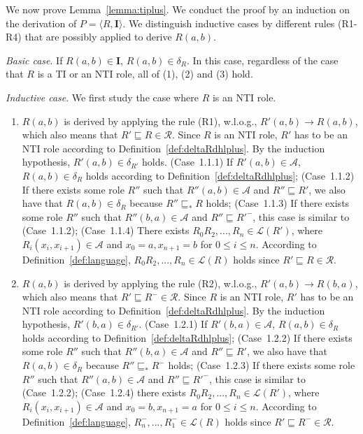 We now prove Lemma~\ref{lemma:tiplus}.
We conduct the proof by an induction on
the derivation of $P=\langle R,\textbf{I}\rangle$. We distinguish inductive cases by different rules (R1-R4)
that are possibly applied to derive $R(a,b)$.

\emph{Basic case}. If $R(a,b)\in\textbf{I}$, $R(a,b)\in\delta_{R}$. In this case,
regardless of the case that $R$ is a TI or an NTI role, all of (1), (2) and (3) hold.

\emph{Inductive case}. We first study the case where $R$ is an NTI role.

\begin{enumerate}[leftmargin=12ex,label=Case~1.\arabic*, ref=Case~1.\arabic*]
\item $R(a,b)$ is derived by applying the rule (R1), w.l.o.g., $R'(a,b)\rightarrow R(a,b)$,
    which also means that $R'\sqsubseteq R\in\mathcal{R}$. Since $R$ is an NTI role, $R'$ has to
    be an NTI role according to Definition~\ref{def:deltaRdhlplus}. By the induction hypothesis,
    $R'(a,b)\in\delta_{R'}$ holds. (Case~1.1.1) If $R'(a,b)\in\mathcal{A}$, $R(a,b)\in\delta_{R}$
    holds according to Definition~\ref{def:deltaRdhlplus}; (Case~1.1.2) If there exists some
    role $R''$ such that $R''(a,b)\in\mathcal{A}$ and $R''\sqsubseteq R'$, we also have that
    $R(a,b)\in\delta_{R}$ because $R''\sqsubseteq_* R$ holds; (Case~1.1.3) If there exists some
    role $R''$ such that $R''(b,a)\in\mathcal{A}$ and $R''\sqsubseteq R'^-$, this case is
    similar to (Case~1.1.2); (Case~1.1.4) There exists $R_0R_2,...,R_n\in\mathcal{L}(R')$,
    where $R_i(x_i,x_{i+1})\in\mathcal{A}$ and $x_0=a, x_{n+1}=b$ for $0\leq i\leq n$.
    According to Definition~\ref{def:language}, $R_0R_2,...,R_n\in\mathcal{L}(R)$ holds since
    $R'\sqsubseteq R\in\mathcal{R}$.\label{dhlplus:NTIcaseR1}

\item $R(a,b)$ is derived by applying the rule (R2), w.l.o.g., $R'(a,b)\rightarrow R(b,a)$,
    which also means that $R'\sqsubseteq R^-\in\mathcal{R}$. Since $R$ is an NTI role, $R'$ has to
    be an NTI role according to Definition~\ref{def:deltaRdhlplus}. By the induction hypothesis,
    $R'(b,a)\in\delta_{R'}$. (Case~1.2.1) If $R'(b,a)\in\mathcal{A}$, $R(a,b)\in\delta_{R}$
    holds according to Definition~\ref{def:deltaRdhlplus}; (Case~1.2.2) If there exists some
    role $R''$ such that $R''(b,a)\in\mathcal{A}$ and $R''\sqsubseteq R'$, we also have that
    $R(a,b)\in\delta_{R}$ because $R''\sqsubseteq_* R^-$ holds; (Case~1.2.3) If there exists some
    role $R''$ such that $R''(a,b)\in\mathcal{A}$ and $R''\sqsubseteq R'^-$, this case is
    similar to (Case~1.2.2); (Case~1.2.4) there exists $R_0R_2,...,R_n\in\mathcal{L}(R')$,
    where $R_i(x_i,x_{i+1})\in\mathcal{A}$ and $x_0=b, x_{n+1}=a$ for $0\leq i\leq n$.
    According to Definition~\ref{def:language}, $R_n^-,...,R_1^-\in\mathcal{L}(R)$ holds since
    $R'\sqsubseteq R^-\in\mathcal{R}$.\label{dhlplus:NTIcaseR2}


\end{enumerate}

